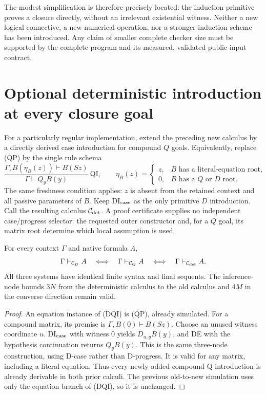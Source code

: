The modest simplification is therefore precisely located: the induction
primitive proves a closure directly, without an irrelevant existential
witness.  Neither a new logical connective, a new numerical operation,
nor a stronger induction scheme has been introduced.  Any claim of
smaller complete checker size must be supported by the complete program
and its measured, validated public input contract.

\section{Optional deterministic introduction at every closure goal}

For a particularly regular implementation, extend the preceding new
calculus by a directly derived case introduction for compound $Q$ goals.
Equivalently, replace (QP) by the single rule schema
\[
 \frac{\Gamma,B(\eta_B(z))\vdash B(Sz)}
      {\Gamma\vdash Q_y B(y)}\ \mathrm{QI},
 \qquad
 \eta_B(z)=
 \begin{cases}
 z,& B\text{ has a literal-equation root},\\
 0,& B\text{ has a }Q\text{ or }D\text{ root}.
 \end{cases}
 \tag{DQI}
\]
The same freshness condition applies: $z$ is absent from the retained
context and all passive parameters of $B$.  Keep DI$_{\rm case}$ as the
only primitive $D$ introduction.  Call the resulting calculus
$\mathcal C_{\rm det}$.  A proof certificate supplies no independent
case/progress selector: the requested outer constructor and, for a $Q$
goal, its matrix root determine which local assumption is used.

\begin{theorem}
For every context $\Gamma$ and native formula $A$,
\[
 \Gamma\vdash_{\mathcal C_D}A
 \quad\Longleftrightarrow\quad
 \Gamma\vdash_{\mathcal C_Q}A
 \quad\Longleftrightarrow\quad
 \Gamma\vdash_{\mathcal C_{\rm det}}A.
\]
All three systems have identical finite syntax and final sequents.
The inference-node bounds $3N$ from the deterministic calculus to the old
calculus and $4M$ in the converse direction remain valid.
\end{theorem}
\begin{proof}
An equation instance of (DQI) is (QP), already simulated.  For a compound
matrix, its premise is $\Gamma,B(0)\vdash B(Sz)$.  Choose an unused
witness coordinate $u$.  DI$_{\rm case}$ with witness $0$ yields
$D_{u,y}B(y)$, and DE with the hypothesis continuation returns $Q_yB(y)$.
This is the same three-node construction, using D-case rather than
D-progress.  It is valid for any matrix, including a literal equation.
Thus every newly added compound-Q introduction is already derivable in
both prior calculi.  The previous old-to-new simulation uses only the
equation branch of (DQI), so it is unchanged.
\end{proof}

